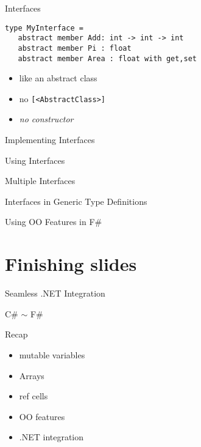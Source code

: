 \documentclass{beamer}
\begin{document}
\begin{frame}[fragile]{Interfaces}
  \begin{verbatim}
type MyInterface =
   abstract member Add: int -> int -> int
   abstract member Pi : float
   abstract member Area : float with get,set
  \end{verbatim}
  \pause
  \begin{itemize}[<+->]
    \item like an abstract class
    \item no \texttt{[<AbstractClass>]}
    \item \textit{no constructor}
  \end{itemize}
\end{frame}

\begin{frame}{Implementing Interfaces}
\end{frame}

\begin{frame}{Using Interfaces}
\end{frame}

\begin{frame}{Multiple Interfaces}
\end{frame}

\begin{frame}{Interfaces in Generic Type Definitions}
\end{frame}

\begin{frame}{Using OO Features in F\#}
\end{frame}

\section{Finishing slides}
\frame{\tableofcontents[currentsection]}

\begin{frame}{Seamless .NET Integration}
\end{frame}

\begin{frame}{C\# $\sim$ F\#}
\end{frame}

\begin{frame}{Recap}
  \begin{itemize}[<+->]
    \item mutable variables
    \item Arrays
    \item ref cells
    \item OO features
    \item .NET integration
  \end{itemize}
\end{frame}
\end{document}
